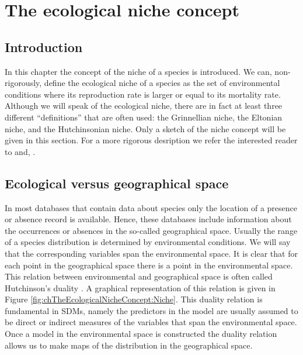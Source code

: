 \chapter{The ecological niche concept}
\label{ch:TheEcologicalNicheConcept}
\section{Introduction}
\label{sec:chTheEcologicalNicheConcept:Introduction}
In this chapter the concept of the niche of a species is introduced. We can, non-rigorously, define the ecological niche of a species as the set of environmental conditions where its reproduction rate is larger or equal to its mortality rate. Although we will speak of the ecological niche, there are in fact at least three different ``definitions'' that are often used: the Grinnellian niche, the Eltonian niche, and the Hutchinsonian niche. Only a sketch of the niche concept will be given in this section. For a more rigorous desription we refer the interested reader to \cite{soberon_grinnellian_2007} and, \cite{soberon_niches_2009}.

\section{Ecological versus geographical space}
In most databases that contain data about species only the location of a presence or absence record is available. Hence, these databases include information about the occurrences or absences in the so-called geographical space. Usually the range of a species distribution is determined by environmental conditions. We will say that the corresponding variables span the environmental space. It is clear that for each point in the geographical space there is a point in the environmental space. This relation between environmental and geographical space is often called Hutchinson's duality \parencite{colwell_hutchinsons_2009}. A graphical representation of this relation is given in Figure \ref{fig:chTheEcologicalNicheConcept:Niche}. This duality relation is fundamental in SDMs, namely the predictors in the model are usually assumed to be direct or indirect measures of the variables that span the environmental space. Once a model in the environmental space is constructed the duality relation allows us to make maps of the distribution in the geographical space. \\

